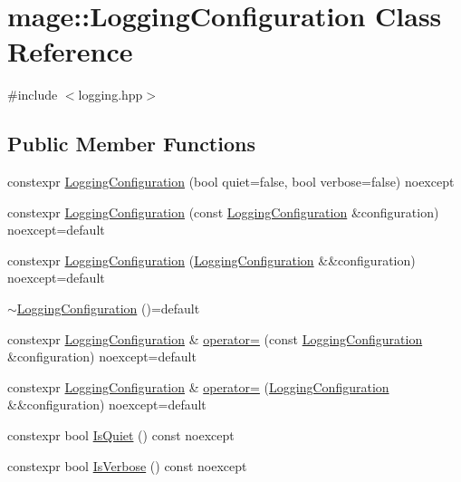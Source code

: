 \hypertarget{classmage_1_1_logging_configuration}{}\section{mage\+:\+:Logging\+Configuration Class Reference}
\label{classmage_1_1_logging_configuration}


{\ttfamily \#include $<$logging.\+hpp$>$}

\subsection*{Public Member Functions}
\begin{DoxyCompactItemize}
\item 
constexpr \hyperlink{classmage_1_1_logging_configuration_a506696943c69d6a56ceef5802e0546ba}{Logging\+Configuration} (bool quiet=false, bool verbose=false) noexcept
\item 
constexpr \hyperlink{classmage_1_1_logging_configuration_a4aa9ae2ac1805e062c2b224b1c65ca85}{Logging\+Configuration} (const \hyperlink{classmage_1_1_logging_configuration}{Logging\+Configuration} \&configuration) noexcept=default
\item 
constexpr \hyperlink{classmage_1_1_logging_configuration_a7cd5793f3a568c82fe29c33ee66aeb14}{Logging\+Configuration} (\hyperlink{classmage_1_1_logging_configuration}{Logging\+Configuration} \&\&configuration) noexcept=default
\item 
\hyperlink{classmage_1_1_logging_configuration_a842cd1d5cf22c9fb6e2c76e684cd08ee}{$\sim$\+Logging\+Configuration} ()=default
\item 
constexpr \hyperlink{classmage_1_1_logging_configuration}{Logging\+Configuration} \& \hyperlink{classmage_1_1_logging_configuration_a17aa265307f73f3c5f96e35e30c0b437}{operator=} (const \hyperlink{classmage_1_1_logging_configuration}{Logging\+Configuration} \&configuration) noexcept=default
\item 
constexpr \hyperlink{classmage_1_1_logging_configuration}{Logging\+Configuration} \& \hyperlink{classmage_1_1_logging_configuration_aeeb70ca4119118f90c7ca4b9cb712f11}{operator=} (\hyperlink{classmage_1_1_logging_configuration}{Logging\+Configuration} \&\&configuration) noexcept=default
\item 
constexpr bool \hyperlink{classmage_1_1_logging_configuration_a1096a1ef5f9237fb76fc5937ac1a1210}{Is\+Quiet} () const noexcept
\item 
constexpr bool \hyperlink{classmage_1_1_logging_configuration_abd81834c6938be1b32a7bd6eb08d5242}{Is\+Verbose} () const noexcept
\end{DoxyCompactItemize}
